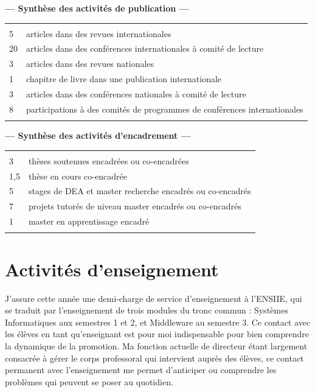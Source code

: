 \documentclass[11pt]{article}
\begin{document}
\begin{center}
	\textbf{--- Synthèse des activités de publication ---}\\[1mm]
\begin{tabular}{ll}
	\hline\\[-2mm]
	5	&	articles dans des revues internationales\\
	20	& 	articles dans des conférences internationales à comité de lecture \\
	3	&	articles dans des revues nationales\\
	1	&	chapitre de livre dans une publication internationale\\
	3	&	articles dans des conférences nationales à comité de lecture\\
	8	& 	participations à des comités de programmes de conférences internationales\\
	\hline\\
\end{tabular}


	\textbf{--- Synthèse des activités d'encadrement ---}\\[1mm]
\begin{tabular}{ll}
	\hline\\[-2mm]
	3	&	thèses soutenues encadrées ou co-encadrées\\
	1,5	& 	thèse en cours co-encadrée\\
	5	&	stages de DEA et master recherche encadrés ou co-encadrés\\
	7	& 	projets tutorés de niveau master encadrés ou co-encadrés\\
	1	& 	master en apprentissage encadré\\
	\hline\\
\end{tabular}

\end{center}



\newpage

\section{Activités d'enseignement}
\label{sc:ensgnt-univ}

J'assure cette année  une demi-charge de service d'enseignement  à l'ENSIIE, qui
se  traduit par  l'enseignement  de trois  modules du  tronc  commun :  Systèmes
Informatiques aux semestres 1 et 2, et Middleware au semestre 3. Ce contact avec
les élèves en tant qu'enseignant est pour moi indispensable pour bien comprendre
la dynamique de la promotion.  Ma fonction actuelle de directeur étant largement
consacrée à  gérer le  corps professoral  qui intervient  auprès des  élèves, ce
contact permanent  avec l'enseignement me  permet d'anticiper ou  comprendre les
problèmes qui peuvent se poser au quotidien.
\end{document}
